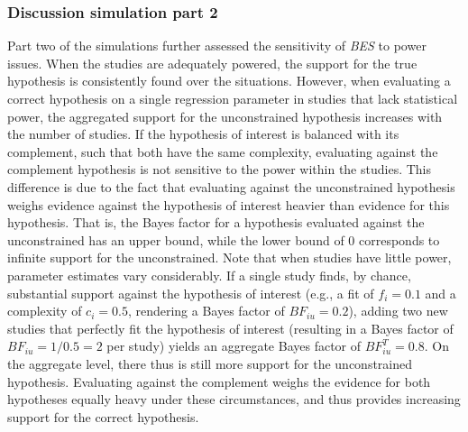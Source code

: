 \documentclass[review, 3p, authoryear]{elsarticle} %
\begin{document}
\hypertarget{discussion-simulation-part-2}{%
\subsubsection{Discussion simulation part 2}\label{discussion-simulation-part-2}}

Part two of the simulations further assessed the sensitivity of \emph{BES} to power issues.
When the studies are adequately powered, the support for the true hypothesis is consistently found over the situations.
However, when evaluating a correct hypothesis on a single regression parameter in studies that lack statistical power, the aggregated support for the unconstrained hypothesis increases with the number of studies.
If the hypothesis of interest is balanced with its complement, such that both have the same complexity,
evaluating against the complement hypothesis is not sensitive to the power within the studies.
This difference is due to the fact that evaluating against the unconstrained hypothesis weighs evidence against the hypothesis of interest heavier than evidence for this hypothesis.
That is, the Bayes factor for a hypothesis evaluated against the unconstrained has an upper bound, while the lower bound of \(0\) corresponds to infinite support for the unconstrained.
Note that when studies have little power, parameter estimates vary considerably.
If a single study finds, by chance, substantial support against the hypothesis of interest (e.g., a fit of \(f_i=0.1\) and a complexity of \(c_i=0.5\), rendering a Bayes factor of \(BF_{iu}=0.2\)), adding two new studies that perfectly fit the hypothesis of interest (resulting in a Bayes factor of \(BF_{iu}=1/0.5=2\) per study) yields an aggregate Bayes factor of \(BF^T_{iu}=0.8\).
On the aggregate level, there thus is still more support for the unconstrained hypothesis.
Evaluating against the complement weighs the evidence for both hypotheses equally heavy under these circumstances, and thus provides increasing support for the correct hypothesis.
\end{document}
